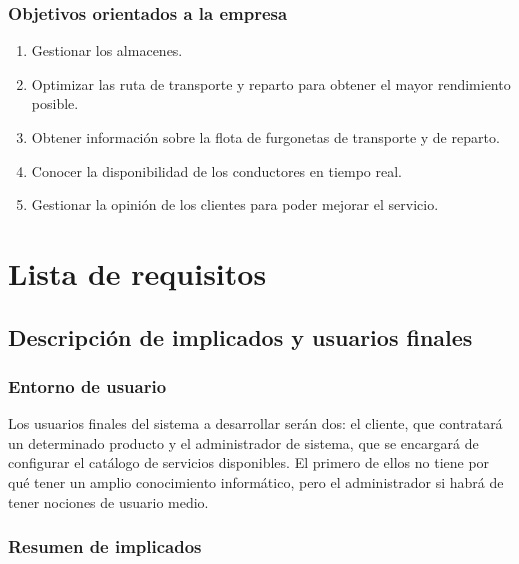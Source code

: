 \documentclass[12pt,spanish]{article}
\begin{document}
\subsubsection{Objetivos orientados a la empresa}
\begin{enumerate}[resume , label=\textbf{OBJ-\arabic*}]
	\item Gestionar los almacenes.
	\item Optimizar las ruta de transporte y reparto para obtener el mayor rendimiento posible. 
	\item Obtener información sobre la flota de furgonetas de transporte y de reparto.
	\item Conocer la disponibilidad de los conductores en tiempo real.
	\item Gestionar la opinión de los clientes para poder mejorar el servicio.
\end{enumerate}
\newpage
\section{Lista de requisitos}

\subsection{Descripción de implicados y usuarios finales}

\subsubsection{Entorno de usuario}
Los usuarios finales del sistema a desarrollar serán dos: el cliente, que contratará un determinado producto y el administrador de sistema, que se encargará de configurar el catálogo de servicios disponibles. El primero de ellos no tiene por qué tener un amplio conocimiento informático, pero el administrador si habrá de tener nociones de usuario medio.
\subsubsection{Resumen de implicados}
\end{document}
